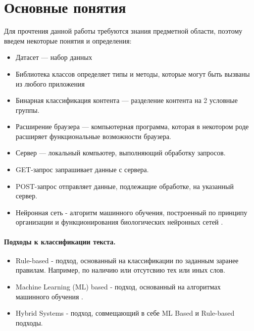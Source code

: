 \documentclass[14pt]{matmex-diploma}
\begin{document}
\section{Основные понятия}

    Для прочтения данной работы требуются знания предметной области, поэтому введем некоторые понятия и определения:
    
        \begin{itemize}
            \item Датасет — набор данных
            \item Библиотека классов определяет типы и методы, которые могут быть вызваны из любого приложения
            \item Бинарная классификация контента — разделение контента на 2 условные группы.
            \item Расширение браузера — компьютерная программа, которая в некотором роде расширяет функциональные возможности браузера.
            \item Сервер — локальный компьютер, выполняющий обработку запросов.
            \item GET-запрос запрашивает данные с сервера.
            \item POST-запрос  отправляет данные, подлежащие обработке, на указанный сервер.
            \item Нейронная сеть - алгоритм машинного обучения, построенный по принципу организации и функционирования биологических нейронных сетей \cite{wiki:nn}.
        \end{itemize}
        
    \paragraph{Подходы к классификации текста.}
        \begin{itemize}
            \item Rule-based - подход, основанный на классификации по заданным заранее правилам. Например, по наличию или отсутсвию тех или иных слов.
            \item Machine Learning (ML) based - подход, основанный на алгоритмах машинного обучения \cite{wiki:ml}.
            \item Hybrid Systems - подход, совмещающий в себе ML Based и Rule-based подходы.
        \end{itemize}
        
\end{document}
